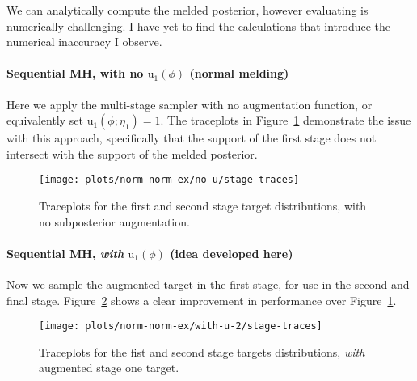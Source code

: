 \documentclass[10pt,a4paper,]{article}
\let\oldparagraph\paragraph
\renewcommand{\paragraph}[1]{\oldparagraph{#1}\mbox{}}
\newcommand{\tarw}{\text{u}}
\begin{document}
We can analytically compute the melded posterior, however evaluating is
numerically challenging. I have yet to find the calculations that
introduce the numerical inaccuracy I observe.

\paragraph{\texorpdfstring{Sequential MH, with no \(\text{u}_{1}(\phi)\)
(normal
melding)}{Sequential MH, with no \textbackslash{}text\{u\}\_\{1\}(\textbackslash{}phi) (normal melding)}}\label{sequential-mh-with-no-textu_1phi-normal-melding}

Here we apply the multi-stage sampler with no augmentation function, or
equivalently set \(\tarw_{1}(\phi; \eta_{1}) = 1\). The traceplots in
Figure~\ref{fig:no_u_traces} demonstrate the issue with this approach,
specifically that the support of the first stage does not intersect with
the support of the melded posterior.

\begin{figure}

{\centering \texttt{[image: plots/norm-norm-ex/no-u/stage-traces]} 

}

\caption{Traceplots for the first and second stage target distributions, with no subposterior augmentation.}\label{fig:no_u_traces}
\end{figure}

\paragraph{\texorpdfstring{Sequential MH, \emph{with}
\(\text{u}_{1}(\phi)\) (idea developed
here)}{Sequential MH, with \textbackslash{}text\{u\}\_\{1\}(\textbackslash{}phi) (idea developed here)}}\label{sequential-mh-with-textu_1phi-idea-developed-here}

Now we sample the augmented target in the first stage, for use in the
second and final stage. Figure~\ref{fig:with_u_traces_2} shows a clear
improvement in performance over Figure~\ref{fig:no_u_traces}.

\begin{figure}

{\centering \texttt{[image: plots/norm-norm-ex/with-u-2/stage-traces]} 

}

\caption{Traceplots for the fist and second stage targets distributions, \textit{with} augmented stage one target.}\label{fig:with_u_traces_2}
\end{figure}
\end{document}
